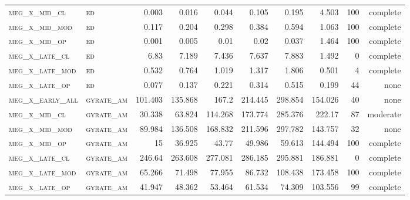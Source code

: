 \begin{landscape}
\begin{center}
\begin{footnotesize}
\begin{longtable}{llrrrrr|rrr}
\textsc{meg\_x\_mid\_cl   } & \textsc{ed        }    & 0.003    & 0.016    & 0.044    & 0.105    & 0.195     & 4.503         & 100           & complete             \\
\textsc{meg\_x\_mid\_mod  } & \textsc{ed        }    & 0.117    & 0.204    & 0.298    & 0.384    & 0.594     & 1.063         & 100           & complete             \\
\textsc{meg\_x\_mid\_op   } & \textsc{ed        }    & 0.001    & 0.005    & 0.01     & 0.02     & 0.037     & 1.464         & 100           & complete             \\
\textsc{meg\_x\_late\_cl  } & \textsc{ed        }    & 6.83     & 7.189    & 7.436    & 7.637    & 7.883     & 1.492         & 0             & complete            \\
\textsc{meg\_x\_late\_mod } & \textsc{ed        }    & 0.532    & 0.764    & 1.019    & 1.317    & 1.806     & 0.501         & 4             & complete             \\
\textsc{meg\_x\_late\_op  } & \textsc{ed        }    & 0.077    & 0.137    & 0.221    & 0.314    & 0.515     & 0.199         & 44            & none             \\
\textsc{meg\_x\_early\_all} & \textsc{gyrate\_am}    & 101.403  & 135.868  & 167.2    & 214.445  & 298.854   & 154.026       & 40            & none             \\
\textsc{meg\_x\_mid\_cl   } & \textsc{gyrate\_am}    & 30.338   & 63.824   & 114.268  & 173.774  & 285.376   & 222.17        & 87            & moderate              \\
\textsc{meg\_x\_mid\_mod  } & \textsc{gyrate\_am}    & 89.984   & 136.508  & 168.832  & 211.596  & 297.782   & 143.757       & 32            & none             \\
\textsc{meg\_x\_mid\_op   } & \textsc{gyrate\_am}    & 15       & 36.925   & 43.77    & 49.986   & 59.613    & 144.494       & 100           & complete             \\
\textsc{meg\_x\_late\_cl  } & \textsc{gyrate\_am}    & 246.64   & 263.608  & 277.081  & 286.185  & 295.881   & 186.881       & 0             & complete            \\
\textsc{meg\_x\_late\_mod } & \textsc{gyrate\_am}    & 65.266   & 71.498   & 77.955   & 86.732   & 108.438   & 173.458       & 100           & complete             \\
\textsc{meg\_x\_late\_op  } & \textsc{gyrate\_am}    & 41.947   & 48.362   & 53.464   & 61.534   & 74.309    & 103.556       & 99            & complete              \\

\end{longtable}
\end{footnotesize}
\end{center}
\end{landscape}
